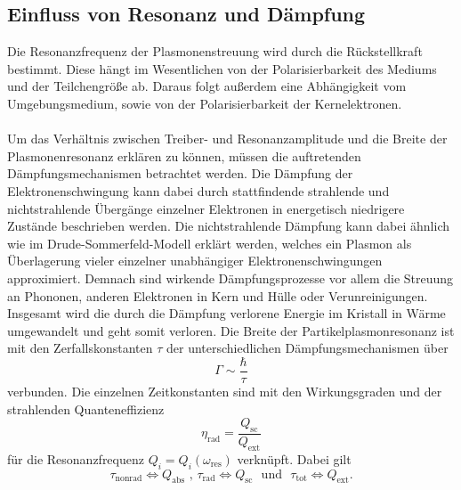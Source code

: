 \subsection{Einfluss von Resonanz und Dämpfung}
Die Resonanzfrequenz der Plasmonenstreuung wird durch die Rückstellkraft bestimmt. Diese hängt im Wesentlichen von der Polarisierbarkeit des Mediums und der Teilchengröße ab. Daraus folgt außerdem eine Abhängigkeit vom Umgebungsmedium, sowie von der Polarisierbarkeit der Kernelektronen.\\
\\
Um das Verhältnis zwischen Treiber- und Resonanzamplitude und die Breite der Plasmonenresonanz erklären zu können, müssen die auftretenden Dämpfungsmechanismen betrachtet werden. Die Dämpfung der Elektronenschwingung kann dabei durch stattfindende strahlende und nichtstrahlende Übergänge einzelner Elektronen in energetisch niedrigere Zustände beschrieben werden.
Die nichtstrahlende Dämpfung kann dabei ähnlich wie im Drude-Sommerfeld-Modell erklärt werden, welches ein Plasmon als Überlagerung vieler einzelner unabhängiger Elektronenschwingungen approximiert. Demnach sind wirkende Dämpfungsprozesse vor allem die Streuung an Phononen, anderen Elektronen in Kern und Hülle oder Verunreinigungen. Insgesamt wird die durch die Dämpfung verlorene Energie im Kristall in Wärme umgewandelt und geht somit verloren. \cite{anleitung}
Die Breite der Partikelplasmonresonanz ist mit den Zerfallskonstanten $\tau$ der unterschiedlichen Dämpfungsmechanismen über
\begin{equation}
  \Gamma \sim \frac{\hbar}{\tau}
\end{equation}
verbunden.\cite{sonne} Die einzelnen Zeitkonstanten sind mit den Wirkungsgraden und der strahlenden Quanteneffizienz
\begin{equation}
  \eta_{\text{rad}} = \frac{Q_{\text{sc}}}{Q_{\text{ext}}}
\end{equation}
für die Resonanzfrequenz $Q_i=Q_i(\omega_{\text{res}})$ verknüpft.
Dabei gilt
\begin{equation}
  \tau_{\text{nonrad}} \iff Q_{\text{abs}} \,\,\text{,}\,\, \tau_{\text{rad}} \iff Q_{\text{sc}} \,\,\,\, \text{und} \,\,\,\, \tau_{\text{tot}} \iff Q_{\text{ext}}.
\end{equation}
